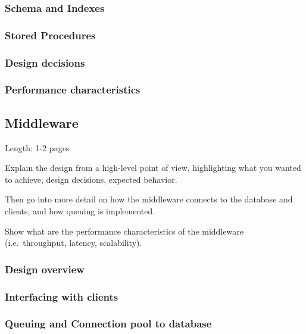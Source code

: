 \documentclass[11pt]{article}
\begin{document}
\subsubsection{Schema and Indexes}\label{sec:schema-and-indexes}

\subsubsection{Stored Procedures}\label{sec:stored-procedures}

\subsubsection{Design decisions}\label{sec:design-decisions}

\subsubsection{Performance characteristics}\label{sec:performance-characteristics}

\subsection{Middleware}\label{sec:middleware}

Length: 1-2 pages

Explain the design from a high-level point of view, highlighting what
you wanted to achieve, design decisions, expected behavior.

Then go into more detail on how the middleware connects to the database
and clients, and how queuing is implemented.

Show what are the performance characteristics of the middleware
(i.e.~throughput, latency, scalability).

\subsubsection{Design overview}\label{sec:design-overview}

\subsubsection{Interfacing with clients}\label{sec:interfacing-with-clients}

\subsubsection{Queuing and Connection pool to database}\label{sec:queuing-and-connection-pool-to-database}
\end{document}
